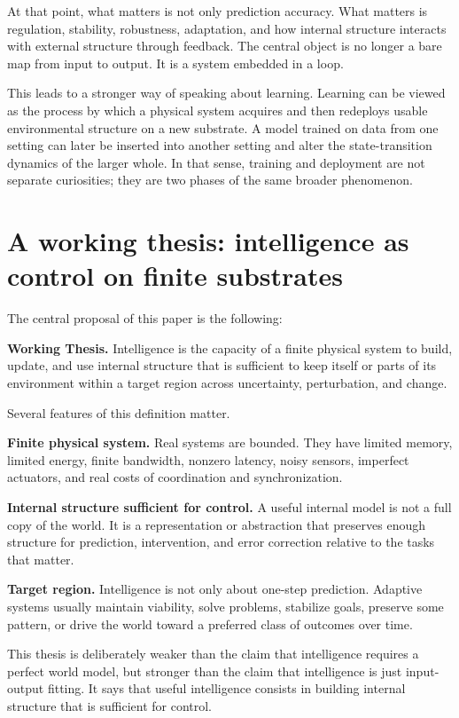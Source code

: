\documentclass[11pt]{article}
\begin{document}
At that point, what matters is not only prediction accuracy. What matters is regulation, stability, robustness, adaptation, and how internal structure interacts with external structure through feedback. The central object is no longer a bare map from input to output. It is a system embedded in a loop.

This leads to a stronger way of speaking about learning. Learning can be viewed as the process by which a physical system acquires and then redeploys usable environmental structure on a new substrate. A model trained on data from one setting can later be inserted into another setting and alter the state-transition dynamics of the larger whole. In that sense, training and deployment are not separate curiosities; they are two phases of the same broader phenomenon.

\section{A working thesis: intelligence as control on finite substrates}

The central proposal of this paper is the following:

\textbf{Working Thesis.} Intelligence is the capacity of a finite physical system to build, update, and use internal structure that is sufficient to keep itself or parts of its environment within a target region across uncertainty, perturbation, and change.

Several features of this definition matter.

\textbf{Finite physical system.} Real systems are bounded. They have limited memory, limited energy, finite bandwidth, nonzero latency, noisy sensors, imperfect actuators, and real costs of coordination and synchronization.

\textbf{Internal structure sufficient for control.} A useful internal model is not a full copy of the world. It is a representation or abstraction that preserves enough structure for prediction, intervention, and error correction relative to the tasks that matter.

\textbf{Target region.} Intelligence is not only about one-step prediction. Adaptive systems usually maintain viability, solve problems, stabilize goals, preserve some pattern, or drive the world toward a preferred class of outcomes over time.

This thesis is deliberately weaker than the claim that intelligence requires a perfect world model, but stronger than the claim that intelligence is just input-output fitting. It says that useful intelligence consists in building internal structure that is sufficient for control.
\end{document}
